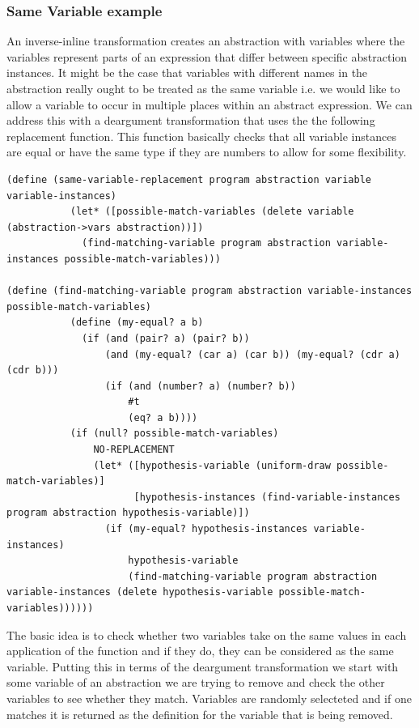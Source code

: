 \documentclass[a4paper,10pt]{article}
\begin{document}
\subsubsection{Same Variable example}
An inverse-inline transformation creates an abstraction with variables where the variables represent parts of an expression that differ between specific abstraction instances.  It might be the case that variables with different names in the abstraction really ought to be treated as the same variable i.e. we would like to allow a variable to occur in multiple places within an abstract expression.  We can address this with a deargument transformation that uses the the following replacement function.  This function basically checks that all variable instances are equal or have the same type if they are numbers to allow for some flexibility.
\begin{lstlisting}[frame=trBL]
(define (same-variable-replacement program abstraction variable variable-instances)
           (let* ([possible-match-variables (delete variable (abstraction->vars abstraction))])
             (find-matching-variable program abstraction variable-instances possible-match-variables)))

(define (find-matching-variable program abstraction variable-instances possible-match-variables)
           (define (my-equal? a b) 
             (if (and (pair? a) (pair? b)) 
                 (and (my-equal? (car a) (car b)) (my-equal? (cdr a) (cdr b))) 
                 (if (and (number? a) (number? b))
                     #t
                     (eq? a b)))) 
           (if (null? possible-match-variables)
               NO-REPLACEMENT
               (let* ([hypothesis-variable (uniform-draw possible-match-variables)]
                      [hypothesis-instances (find-variable-instances program abstraction hypothesis-variable)])
                 (if (my-equal? hypothesis-instances variable-instances)
                     hypothesis-variable
                     (find-matching-variable program abstraction variable-instances (delete hypothesis-variable possible-match-variables))))))
\end{lstlisting}
The basic idea is to check whether two variables take on the same values in each application of the function and if they do, they can be considered as the same variable.  Putting this in terms of the deargument transformation we start with some variable of an abstraction we are trying to remove and check the other variables to see whether they match.  Variables are randomly selecteted and if one matches it is returned as the definition for the variable that is being removed.  
\end{document}
